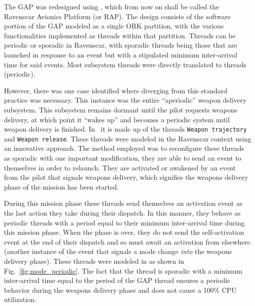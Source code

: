 The GAP was redesigned using \aadl, which from now on shall be called
the Ravenscar Avionics Platform (or RAP). The design consists of the
software portion of the GAP modeled as a single ORK partition, with
the various functionalities implemented as threads within that
partition. Threads can be periodic or sporadic in Ravenscar, with
sporadic threads being those that are launched in response to an event
but with a stipulated minimum inter-arrival time for said events. Most
subsystem threads were directly translated to \aadl threads
(periodic).

However, there was one case identified where diverging from this
standard practice was necessary. This instance was the entire
``aperiodic'' weapon delivery subsystem. This subsystem remains
dormant until the pilot requests weapons delivery, at which point it
``wakes up'' and becomes a periodic system until weapon delivery is
finished. In~\cite{locke@sei90} it is made up of the threads
\texttt{Weapon trajectory} and \texttt{Weapon release}. These threads
were modeled in the Ravenscar context using an innovative
approach. The method employed was to reconfigure these threads as
sporadic with one important modification, they are able to send an
event to themselves in order to relaunch. They are activated or
awakened by an event from the pilot that signals weapons delivery,
which signifies the weapons delivery phase of the mission has been
started.

During this mission phase these threads send themselves an activation
event as the last action they take during their dispatch. In this
manner, they behave as periodic threads with a period equal to their
minimum inter-arrival time during this mission phase. When the phase
is over, they do not send the self-activation event at the end of
their dispatch and so must await an activation from elsewhere (another
instance of the event that signals a mode change \emph{into} the
weapons delivery phase). These threads were modeled in \aadl as shown
in Fig.~\ref{fig:mode_periodic}. The fact that the thread is sporadic
with a minimum inter-arrival time equal to the period of the GAP
thread ensures a periodic behavior during the weapons delivery phase
and does not cause a 100\% CPU utilization.

